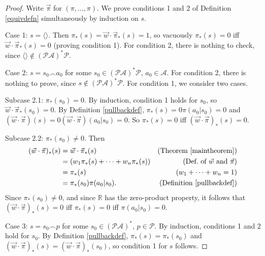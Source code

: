 \documentclass[runningheads]{llncs}
\begin{document}
\begin{proof}
    Write $\vec\pi$ for $(\pi,\ldots,\pi)$.
    We prove conditions 1 and 2 of Definition \ref{equivdefn}
    simultaneously by induction on $s$.
 
    Case 1: $s=\langle\rangle$. Then
    $\pi_*(s)=\vec w\cdot\vec\pi_*(s)=1$, so
    vacuously $\pi_*(s)=0$ iff $\vec w\cdot\vec\pi_*(s)=0$
    (proving condition 1).
    For condition 2, there is nothing to check, since
    $\langle\rangle\not\in(\mathcal P\mathcal A)^*\mathcal P$.

    Case 2: $s=s_0\frown a_0$ for some
        $s_0\in(\mathcal P\mathcal A)^*\mathcal P$, $a_0\in\mathcal A$.
        For condition 2, there is nothing to prove, since
        $s\not\in(\mathcal P\mathcal A)^*\mathcal P$.
        For condition 1, we consider two cases.

        Subcase 2.1: $\pi_*(s_0)=0$.
        By induction, condition 1 holds for $s_0$, so
        $\vec w\cdot\vec\pi_*(s_0)=0$.
        By Definition \ref{pullbackdef},
        $\pi_*(s)=0\pi(a_0|s_0)=0$
        and $(\vec w\cdot\vec\pi)(s)=0(\vec w\cdot\vec\pi)(a_0|s_0)=0$.
        So $\pi_*(s)=0$ iff $(\vec w\cdot\vec\pi)_*(s)=0$.

        Subcase 2.2: $\pi_*(s_0)\not=0$.
        Then
        \begin{align*}
            (\vec w\cdot \vec\pi)_*(s)
                &= \vec w\cdot\vec\pi_*(s)
                    &\mbox{(Theorem \ref{maintheorem})}\\
                &= (w_1\pi_*(s)+\cdots+w_n\pi_*(s))
                    &\mbox{(Def.\ of $\vec w$ and $\vec\pi$)}\\
                &= \pi_*(s)
                    &\mbox{($w_1+\cdots+w_n=1$)}\\
                &= \pi_*(s_0)\pi(a_0|s_0).
                    &\mbox{(Definition \ref{pullbackdef})}
        \end{align*}
        Since $\pi_*(s_0)\not=0$, and since $\mathbb R$ has the zero-product property,
        it follows that
        $(\vec w\cdot\vec\pi)_*(s)=0$ iff $\pi_*(s)=0$ iff $\pi(a_0|s_0)=0$.

    Case 3: $s=s_0\frown p$ for some $s_0\in (\mathcal P\mathcal A)^*$,
        $p\in\mathcal P$.
        By induction, conditions 1 and 2 hold for $s_0$.
        By Definition \ref{pullbackdef},
        $\pi_*(s)=\pi_*(s_0)$ and $(\vec w\cdot\vec\pi)_*(s)=(\vec w\cdot\vec\pi)_*(s_0)$,
        so condition 1 for $s$ follows.


\end{proof}
\end{document}
